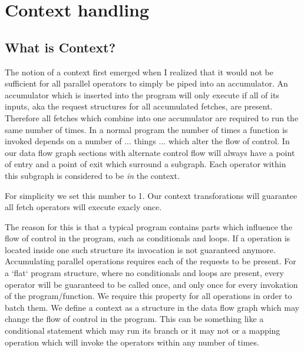 
\chapter{Context handling} %

\label{ChapterContext} %


\section{What is Context?}

The notion of a context first emerged when I realized that it would not be sufficient for all parallel \fetch{} operators to simply be piped into an accumulator.
An accumulator which is inserted into the program will only execute if all of its inputs, aka the request structures for all accumulated fetches, are present.
Therefore all fetches which combine into one accumulator are required to run the same number of times.
In a normal program the number of times a function is invoked depends on a number of ... things ... which alter the flow of control.
In our data flow graph sections with alternate control flow will always have a point of entry and a point of exit which surround a subgraph.
Each operator within this subgraph is considered to be \textit{in} the context.


For simplicity we set this number to 1.
Our context transforations will guarantee all fetch operators will execute exacly once.


The reason for this is that a typical program contains parts which influence the flow of control in the program, such as conditionals and loops.
If a \fetch{} operation is located inside one such structure its invocation is not guaranteed anymore.
Accumulating parallel \fetch{} operations requires each of the requests to be present.
For a `flat` program structure, where no conditionals and loops are present, every operator will be guaranteed to be called once, and only once for every invokation of the program/function.
We require this property for all \fetch{} operations in order to batch them.
We define a context as a structure in the data flow graph which may change the flow of control in the program.
This can be something like a conditional statement which may run its branch or it may not or a mapping operation which will invoke the operators within any number of times.


